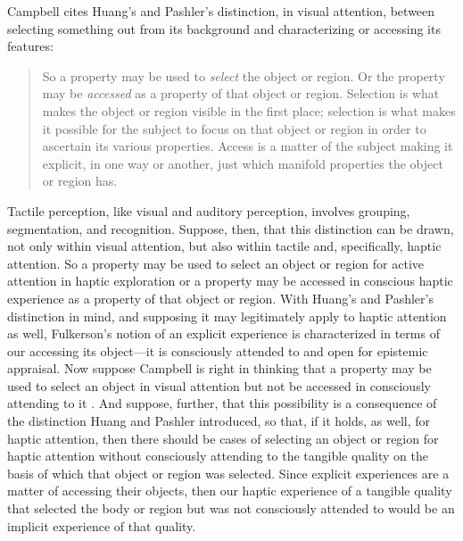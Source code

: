 Campbell cites Huang's and Pashler's \citeyearpar{Huang:2007jk} distinction, in visual attention, between selecting something out from its background and characterizing or accessing its features: 
\begin{quote}
	So a property may be used to \emph{select} the object or region. Or the property may be \emph{accessed} as a property of that object or region. Selection is what makes the object or region visible in the first place; selection is what makes it possible for the subject to focus on that object or region in order to ascertain its various properties. Access is a matter of the subject making it explicit, in one way or another, just which manifold properties the object or region has. \citep[Campbell in][54]{Campbell:2014aa}
\end{quote}
Tactile perception, like visual and auditory perception, involves grouping, segmentation, and recognition. Suppose, then, that this distinction can be drawn, not only within visual attention, but also within tactile and, specifically, haptic attention. So a property may be used to select an object or region for active attention in haptic exploration or a property may be accessed in conscious haptic experience as a property of that object or region. With Huang's and Pashler's distinction in mind, and supposing it may legitimately apply to haptic attention as well, Fulkerson's notion of an explicit experience is characterized in terms of our accessing its object---it is  consciously attended to and open for epistemic appraisal. Now suppose Campbell is right in thinking that a property may be used to select an object in visual attention but not be accessed in consciously attending to it \citep[chapter 3.2]{Campbell:2014aa}. And suppose, further, that this possibility is a consequence of the distinction Huang and Pashler introduced, so that, if it holds, as well, for haptic attention, then there should be cases of selecting an object or region for haptic attention without consciously attending to the tangible quality on the basis of which that object or region was selected. Since explicit experiences are a matter of accessing their objects, then our haptic experience of a tangible quality that selected the body or region but was not consciously attended to would be an implicit experience of that quality.

